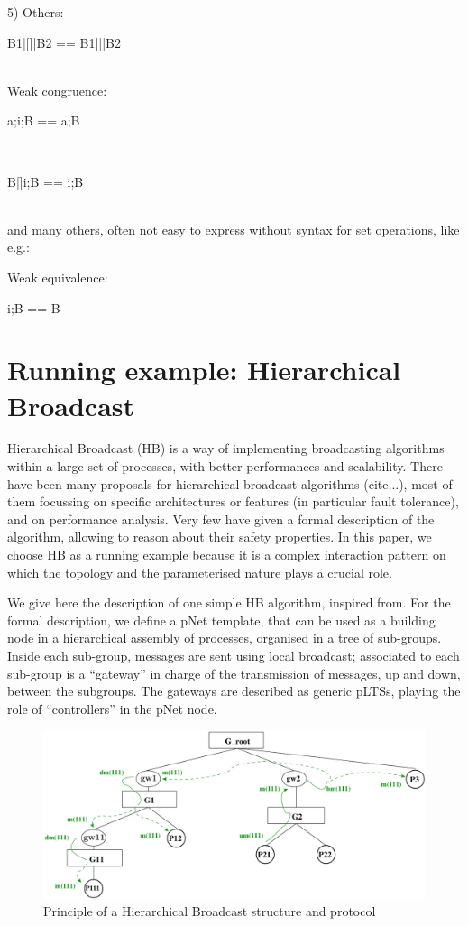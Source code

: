 \documentclass{lncs/llncs}
\begin{document}
5) Others:\\
\centerline{B1|[]|B2 == B1|||B2}\\


      
Weak congruence:\\
\centerline{a;i;B == a;B}\\
\centerline{B[]i;B == i;B}\\
and many others, often not easy to express without syntax for set operations,
like e.g.:
\centerline{}


Weak equivalence:\\
\centerline{i;B == B}

\newpage
  \section{Running example: Hierarchical Broadcast}

Hierarchical Broadcast (HB) is a way of implementing broadcasting
algorithms within a large set of processes, with better performances
and scalability. There have been many proposals for hierarchical
broadcast algorithms (cite...), most of them focussing on specific
architectures or features (in particular fault tolerance), and on
performance analysis. Very few have given a formal description of the
algorithm, allowing to reason about their safety properties.
In this paper, we choose HB as a running example because it is a
complex interaction pattern on which the topology and the
parameterised nature plays a crucial role.

We give here the description of one simple HB algorithm, inspired
from\cite{Taguchi03}. For the formal description, we define a
pNet template, that can be used as a building node in a hierarchical
assembly of processes, organised in a tree of sub-groups. Inside each
sub-group, messages are sent using  local broadcast; associated to
each sub-group is a ``gateway'' in charge of the
transmission of messages, up and down, between the subgroups. The
gateways are described as generic pLTSs, playing the role of
``controllers'' in the pNet node.

\begin{figure}[t]
\centerline{  \includegraphics[width=0.9\linewidth]{XFIG/SchemaHB2}}
  \caption{Principle of a Hierarchical Broadcast structure and protocol}
  \label{fig:hb-scenario}
\end{figure}
\end{document}
